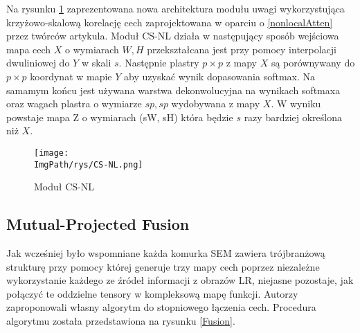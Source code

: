 \documentclass[a4paper,12pt,twoside,openany]{report}
\newcommand{\ImgPath}{.}
\begin{document}
	Na rysunku \ref{CS-NL} zaprezentowana nowa architektura modułu uwagi wykorzystująca krzyżowo-skalową korelację cech zaprojektowana w oparciu o \ref{nonlocalAtten} przez twórców artykula. Moduł CS-NL działa w następujący sposób wejściowa mapa cech $X$ o wymiarach $W,H$ przekształcana jest przy pomocy interpolacji dwuliniowej do $Y$ w skali $s$. Następnie  plastry $p \times p$ z mapy $X$ są porównywany do $p \times p$ koordynat w mapie $Y$ aby uzyskać wynik dopasowania softmax. Na samamym końcu jest używana warstwa dekonwolucyjna na wynikach softmaxa oraz wagach plastra o wymiarze $sp,sp$ wydobywana z mapy $X$. W wyniku powstaje mapa Z o wymiarach (sW, sH) która będzie $s$ razy bardziej określona niż $X$.
	
	\begin{figure}[!htbp]
		\begin{center}
			\centering
			\texttt{[image: \\ImgPath/rys/CS-NL.png]}
		\end{center}
		\caption{Moduł CS-NL}
		\label{CS-NL}
	\end{figure} 


	\subsection{Mutual-Projected Fusion}
	Jak wcześniej było wspomniane każda komurka SEM zawiera trójbranżową strukturę przy pomocy której generuje trzy mapy cech poprzez niezależne wykorzystanie każdego ze źródeł informacji z obrazów LR, niejasne pozostaje, jak połączyć te oddzielne tensory w kompleksową mapę funkcji. Autorzy zaproponowali własny algorytm do stopniowego łączenia cech. Procedura algorytmu została przedstawiona na rysunku \ref{Fusion}.
	
\end{document}

